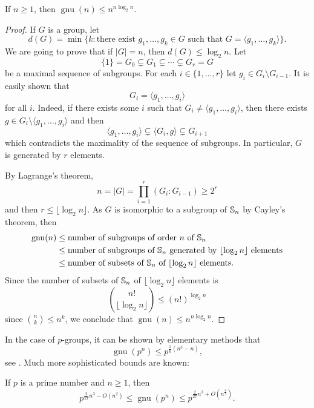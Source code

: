 \begin{theorem}
If $n\geq1$, then $\operatorname{gnu}(n)\leq n^{n\log_2 n}$.
\end{theorem}

\begin{proof}
If $G$ is a group, let
\[
d(G)=\min\{k:\text{there exist }g_1,\dots,g_k\in G\text{ such that }G=\langle g_1,\dots,g_k\rangle\}.
\]
We are going to prove that if $|G|=n$, then $d(G)\leq\log_2 n$. Let
\[
\{1\}=G_0\subsetneq G_1\subsetneq\cdots\subsetneq G_r=G
\]
be a maximal sequence of subgroups. For each $i\in\{1,\dots,r\}$ let
$g_i\in G_i\setminus G_{i-1}$. It is easily shown
that
\[
G_i=\langle g_1,\dots,g_i\rangle
\]
for all $i$. 
Indeed, if there exists some $i$ such that $G_i\ne\langle g_1,\dots,g_i\rangle$, then
there exists $g\in G_i\setminus\langle g_1,\dots,g_i\rangle$ and then
\[
\langle g_1,\dots,g_i\rangle\subsetneq \langle G_i,g\rangle\subsetneq G_{i+1}
\]
which contradicts the maximality of the sequence of subgroups. In particular, $G$ is generated 
by $r$ elements.

By Lagrange's theorem, 
\[
n=|G|=\prod_{i=1}^r(G_i:G_{i-1})\geq 2^r
\]
and then $r\leq\lfloor \log_2 n\rfloor$. 
As $G$ is isomorphic to a 
subgroup of $\mathbb{S}_n$ by Cayley's theorem, then 
\begin{align*}
\operatorname{gnu}(n)
&\leq\text{number of subgroups of order $n$ of $\mathbb{S}_n$}\\
&\leq\text{number of subgroups of $\mathbb{S}_n$ generated by $\lfloor\log_2n\rfloor$ elements}\\
&\leq\text{number of subsets of $\mathbb{S}_n$ of $\lfloor\log_2n\rfloor$ elements}.
\end{align*}
Since the number of subsets of $\mathbb{S}_n$ of $\lfloor\log_2n\rfloor$ elements
is
\[
\binom{n!}{\lfloor\log_2n\rfloor}\leq(n!)^{\log_2n}
\]
since $\binom{n}{k}\leq n^k$, we conclude that $\operatorname{gnu}(n)\leq n^{n\log_2n}$.
\end{proof}

In the case of $p$-groups, it can be shown by elementary methods 
that
\[
\operatorname{gnu}(p^n)\leq p^{\frac16(n^3-n)},
\]
see \cite[Theorem 5.1]{MR2382539}. Much more sophisticated bounds are known:

\begin{theorem}
If $p$ is a prime number and $n\geq1$, then
\[
p^{\frac{2}{27}n^3-O(n^2)}\leq\operatorname{gnu}(p^n)\leq p^{\frac{2}{27}n^3+O(n^{\frac{8}{3}})}.
\]
\end{theorem}

